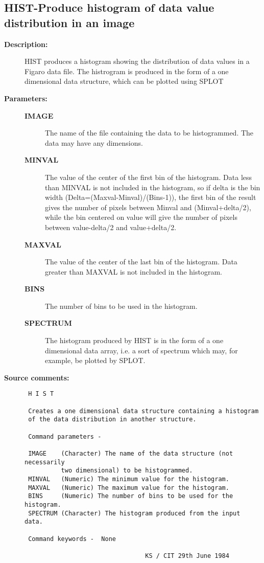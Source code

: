 \subsection{HIST-\label{HIST}Produce histogram of data value distribution in an image}
\begin{description}

\item [{\bf Description:}]
 HIST produces a histogram showing the distribution of data values
 in a Figaro data file.  The histrogram is produced in the form of
 a one dimensional data structure, which can be plotted using SPLOT

\item [{\bf Parameters:}]
\begin{description}
\item [{\bf IMAGE}]
 The name of the file containing the data to be
 histogrammed.  The data may have any dimensions.
\item [{\bf MINVAL}]
 The value of the center of the first bin of the
 histogram.  Data less than MINVAL is not included
 in the histogram, so if delta is the bin width
 (Delta=(Maxval-Minval)/(Bins-1)), the first bin
 of the result gives the number of pixels between
 Minval and (Minval+delta/2), while the bin centered
 on value will give the number of pixels between
 value-delta/2 and value+delta/2.
\item [{\bf MAXVAL}]
 The value of the center of the last bin of the
 histogram.  Data greater than MAXVAL is not
 included in the histogram.
\item [{\bf BINS}]
 The number of bins to be used in the histogram.
\item [{\bf SPECTRUM}]
 The histogram produced by HIST is in the form of a
 one dimensional data array, i.e. a sort of spectrum
 which may, for example, be plotted by SPLOT.
\end{description}

\item [{\bf Source comments:}]
\begin{verbatim}
 H I S T

 Creates a one dimensional data structure containing a histogram
 of the data distribution in another structure.

 Command parameters -

 IMAGE    (Character) The name of the data structure (not necessarily
          two dimensional) to be histogrammed.
 MINVAL   (Numeric) The minimum value for the histogram.
 MAXVAL   (Numeric) The maximum value for the histogram.
 BINS     (Numeric) The number of bins to be used for the histogram.
 SPECTRUM (Character) The histogram produced from the input data.

 Command keywords -  None

                                 KS / CIT 29th June 1984
\end{verbatim}
\end{description}
